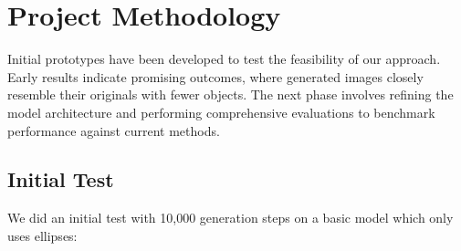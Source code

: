 \documentclass[10pt, conference]{IEEEtran}
\begin{document}
\section{Project Methodology}
Initial prototypes have been developed to test the feasibility of our approach. Early results indicate promising outcomes, where generated images closely resemble their originals with fewer objects. The next phase involves refining the model architecture and performing comprehensive evaluations to benchmark performance against current methods.

\subsection*{
Initial Test
}
We did an initial test with 10,000 generation steps on a basic model which only uses ellipses:\\
\end{document}
